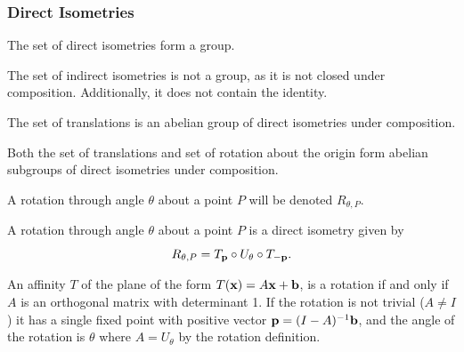 \subsubsection{Direct Isometries}


\begin{proposition}
    The set of direct isometries form a group.
\end{proposition}

The set of indirect isometries is not a group, as it is not closed under composition. Additionally, it does not contain the identity.


\begin{theorem}
    The set of translations is an abelian group of direct isometries under composition.
\end{theorem}


\begin{theorem}
    Both the set of translations and set of rotation about the origin form abelian subgroups of direct isometries under composition.
\end{theorem}

\begin{definition}
    A rotation through angle \(\theta\) about a point \(P\) will be denoted \(R_{\theta, P}\).
\end{definition}

\begin{theorem}
    A rotation through angle \(\theta\) about a point \(P\) is a direct isometry given by
    \[R_{\theta, P} = T_{\mathbf{p}} \circ U_\theta \circ T_{-\mathbf{p}}.\]
\end{theorem}

\begin{theorem}
    An affinity \(T\) of the plane of the form \(T(\mathbf{x}) = A\mathbf{x} + \mathbf{b}\), is a rotation if and only if \(A\) is an orthogonal matrix with determinant 1. If the rotation is not trivial (\(A \neq I\)) it has a single fixed point with positive vector \(\mathbf{p} = (I - A)^{-1}\mathbf{b}\), and the angle of the rotation is \(\theta\) where \(A = U_\theta\) by the rotation definition.
\end{theorem}

